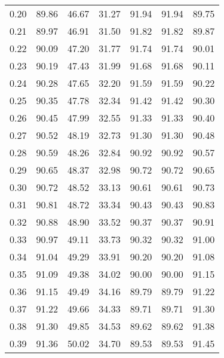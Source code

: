 \begin{tabular}{|c|c|c|c|c|c|c|}
      0.20 &     89.86 &     46.67 &      31.27 &   91.94 &      91.94 &         89.75 \\
      0.21 &     89.97 &     46.91 &      31.50 &   91.82 &      91.82 &         89.87 \\
      0.22 &     90.09 &     47.20 &      31.77 &   91.74 &      91.74 &         90.01 \\
      0.23 &     90.19 &     47.43 &      31.99 &   91.68 &      91.68 &         90.11 \\
      0.24 &     90.28 &     47.65 &      32.20 &   91.59 &      91.59 &         90.22 \\
      0.25 &     90.35 &     47.78 &      32.34 &   91.42 &      91.42 &         90.30 \\
      0.26 &     90.45 &     47.99 &      32.55 &   91.33 &      91.33 &         90.40 \\
      0.27 &     90.52 &     48.19 &      32.73 &   91.30 &      91.30 &         90.48 \\
      0.28 &     90.59 &     48.26 &      32.84 &   90.92 &      90.92 &         90.57 \\
      0.29 &     90.65 &     48.37 &      32.98 &   90.72 &      90.72 &         90.65 \\
      0.30 &     90.72 &     48.52 &      33.13 &   90.61 &      90.61 &         90.73 \\
      0.31 &     90.81 &     48.72 &      33.34 &   90.43 &      90.43 &         90.83 \\
      0.32 &     90.88 &     48.90 &      33.52 &   90.37 &      90.37 &         90.91 \\
      0.33 &     90.97 &     49.11 &      33.73 &   90.32 &      90.32 &         91.00 \\
      0.34 &     91.04 &     49.29 &      33.91 &   90.20 &      90.20 &         91.08 \\
      0.35 &     91.09 &     49.38 &      34.02 &   90.00 &      90.00 &         91.15 \\
      0.36 &     91.15 &     49.49 &      34.16 &   89.79 &      89.79 &         91.22 \\
      0.37 &     91.22 &     49.66 &      34.33 &   89.71 &      89.71 &         91.30 \\
      0.38 &     91.30 &     49.85 &      34.53 &   89.62 &      89.62 &         91.38 \\
      0.39 &     91.36 &     50.02 &      34.70 &   89.53 &      89.53 &         91.45 \\

\end{tabular}

